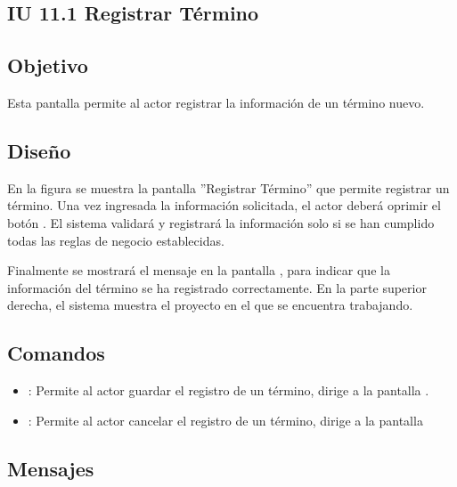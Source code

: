 \subsection{IU 11.1 Registrar Término}

\subsection{Objetivo}
	Esta pantalla permite al actor registrar la información de un término nuevo.
\subsection{Diseño}
	En la figura  se muestra la pantalla ''Registrar Término'' que permite registrar un término.
	Una vez ingresada la información solicitada, el actor deberá oprimir el botón  . El sistema validará y registrará la información solo si se han cumplido todas las reglas de negocio establecidas.
	
	Finalmente se mostrará el mensaje  en la pantalla , para indicar que la información del término se ha registrado correctamente.
	En la parte superior derecha, el sistema muestra el proyecto en el que se encuentra trabajando.

\subsection{Comandos}
\begin{itemize}
	\item {}: Permite al actor guardar el registro de un término, dirige a la pantalla .
	\item {}: Permite al actor cancelar el registro de un término, dirige a la pantalla 
\end{itemize}

\subsection{Mensajes}

